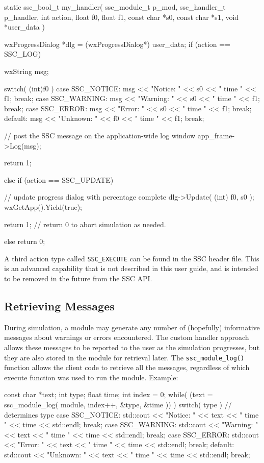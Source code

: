\documentclass{article}
\begin{document}
\begin{verbatimtab}[4]
static ssc_bool_t my_handler( ssc_module_t p_mod, ssc_handler_t p_handler, int action, 
	float f0, float f1, const char *s0, const char *s1, void *user_data )
{
	wxProgressDialog *dlg = (wxProgressDialog*) user_data;
	if (action == SSC_LOG)
	{
		wxString msg;

		switch( (int)f0 )
		{
		case SSC_NOTICE: msg << "Notice: " << s0 << " time " << f1; break;
		case SSC_WARNING: msg << "Warning: " << s0 << " time " << f1; break;
		case SSC_ERROR: msg << "Error: " << s0 << " time " << f1; break;
		default: msg << "Unknown: " << f0 << " time " << f1; break;
		}

		// post the SSC message on the application-wide log window 
		app_frame->Log(msg);

		return 1;
	}
	else if (action == SSC_UPDATE)
	{
 		// update progress dialog with percentage complete
		dlg->Update( (int) f0, s0 );
		wxGetApp().Yield(true);

		return 1; // return 0 to abort simulation as needed.
	}
	else
		return 0;
}
\end{verbatimtab}

A third action type called \texttt{SSC\_EXECUTE} can be found in the SSC header file.  This is an advanced capability that is not described in this user guide, and is intended to be removed in the future from the SSC API.

\subsection{Retrieving Messages}
\label{sec_messages}

During simulation, a module may generate any number of (hopefully) informative messages about warnings or errors encountered.  The custom handler approach allows these messages to be reported to the user as the simulation progresses, but they are also stored in the module for retrieval later.  The \texttt{ssc\_module\_log()} function allows the client code to retrieve all the messages, regardless of which execute function was used to run the module.  Example:

\begin{verbatimtab}[4]
const char *text;
int type;
float time;
int index = 0;
while( (text = ssc_module_log( module, index++, &type, &time )) )
{
	switch( type ) // determines type
	{
	case SSC_NOTICE: 
		std::cout << "Notice: " << text << " time " << time << std::endl; 
		break;
	case SSC_WARNING: 
		std::cout << "Warning: " << text << " time " << time << std::endl; 
		break;
	case SSC_ERROR: 
		std::cout << "Error: " << text << " time " << time << std::endl; 
		break;
	default: 
		std::cout << "Unknown: " << text << " time " << time << std::endl; 
		break;
	}
}
\end{verbatimtab}
\end{document}
